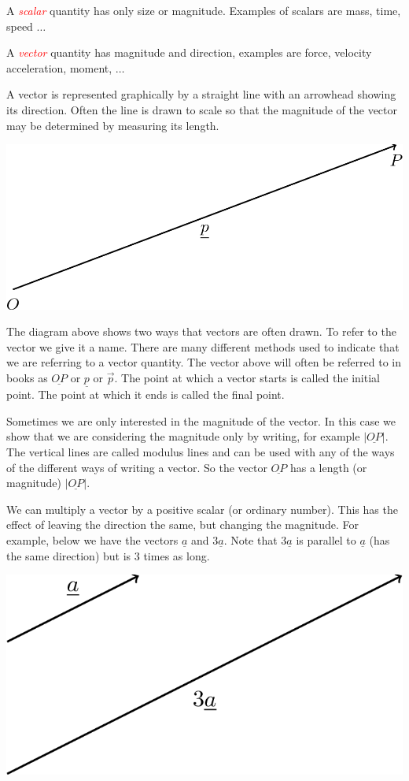 \documentclass[
  11pt,
  oneside]{book}
\theoremstyle{definition}
\theoremstyle{definition}
\theoremstyle{definition}
\theoremstyle{definition}
\theoremstyle{remark}
\begin{document}
A \textcolor{red}{\em scalar} quantity has only size or magnitude. Examples of scalars are mass, time, speed \(\ldots\)

A \textcolor{red}{\em vector} quantity has magnitude and direction, examples are force, velocity acceleration, moment, \(\ldots\)

A vector is represented graphically by a straight line with an arrowhead showing its direction. Often the line is drawn to scale so that the magnitude of the vector may be determined by measuring its length.

\begin{center}\includegraphics[width=0.3\linewidth]{tikztopng-figure46} \end{center}

The diagram above shows two ways that vectors are often drawn. To refer to the vector we give it a name. There are many different methods used to indicate that we are referring to a vector quantity. The vector above will often be referred to in books as \(\underline{OP}\) or \(\underline p\) or \(\vec{p}\). The point at which a vector starts is called the initial point. The point at which it ends is called the final point.

Sometimes we are only interested in the magnitude of the vector. In this case we show that we are considering the magnitude only by writing, for example \(|\underline{OP}|\). The vertical lines are called modulus lines and can be used with any of the ways of the different ways of writing a vector. So the vector \(\underline{OP}\) has a length (or magnitude) \(|\underline{OP}|\).

We can multiply a vector by a positive scalar (or ordinary number). This has the effect of leaving the direction the same, but changing the magnitude. For example, below we have the vectors \(\underline a\) and \(3\underline a\). Note that \(3\underline a\) is parallel to \(\underline a\) (has the same direction) but is \(3\) times as long.

\begin{center}\includegraphics[width=0.3\linewidth]{tikztopng-figure47} \end{center}
\end{document}
